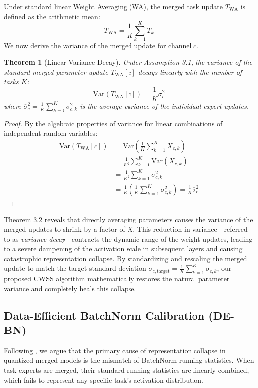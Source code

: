 \documentclass{article}
\theoremstyle{plain}
\newtheorem{theorem}{Theorem}[section]
\theoremstyle{definition}
\theoremstyle{remark}
\begin{document}
Under standard linear Weight Averaging (WA), the merged task update $T_{\text{WA}}$ is defined as the arithmetic mean:
\begin{equation}
T_{\text{WA}} = \frac{1}{K}\sum_{k=1}^K T_k
\end{equation}
We now derive the variance of the merged update for channel $c$.
\begin{theorem}[Linear Variance Decay]
Under Assumption 3.1, the variance of the standard merged parameter update $T_{\text{WA}}[c]$ decays linearly with the number of tasks $K$:
\begin{equation}
\text{Var}(T_{\text{WA}}[c]) = \frac{1}{K} \overline{\sigma}_c^2
\end{equation}
where $\overline{\sigma}_c^2 = \frac{1}{K} \sum_{k=1}^K \sigma_{c,k}^2$ is the average variance of the individual expert updates.
\end{theorem}
\begin{proof}
By the algebraic properties of variance for linear combinations of independent random variables:
\begin{align}
\text{Var}(T_{\text{WA}}[c]) &= \text{Var}\left(\frac{1}{K}\sum_{k=1}^K X_{c,k}\right) \\
&= \frac{1}{K^2} \sum_{k=1}^K \text{Var}(X_{c,k}) \\
&= \frac{1}{K^2} \sum_{k=1}^K \sigma_{c,k}^2 \\
&= \frac{1}{K} \left(\frac{1}{K}\sum_{k=1}^K \sigma_{c,k}^2\right) = \frac{1}{K} \overline{\sigma}_c^2
\end{align}
\end{proof}
Theorem 3.2 reveals that directly averaging parameters causes the variance of the merged updates to shrink by a factor of $K$. This reduction in variance—referred to as \textit{variance decay}—contracts the dynamic range of the weight updates, leading to a severe dampening of the activation scale in subsequent layers and causing catastrophic representation collapse. By standardizing and rescaling the merged update to match the target standard deviation $\sigma_{c, \text{target}} = \frac{1}{K}\sum_{k=1}^K \sigma_{c,k}$, our proposed CWSS algorithm mathematically restores the natural parameter variance and completely heals this collapse.

\subsection{Data-Efficient BatchNorm Calibration (DE-BN)}
Following \cite{paper2}, we argue that the primary cause of representation collapse in quantized merged models is the mismatch of BatchNorm running statistics. When task experts are merged, their standard running statistics are linearly combined, which fails to represent any specific task's activation distribution. 
\end{document}
